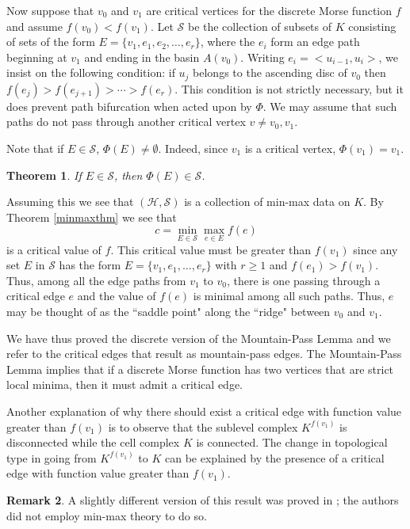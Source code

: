 \documentclass[11pt]{amsart}
\newtheorem{theorem}{Theorem}[section]
\theoremstyle{definition}
\newtheorem{remark}[theorem]{Remark}
\begin{document}
Now suppose that $v_0$ and $v_1$ are critical vertices for the discrete Morse function $f$ and assume $f(v_0)<f(v_1)$. Let $\mathcal{S}$ be the collection of subsets of $K$ consisting of sets of the form $E=\{v_1,e_1,e_2,\dots,e_r\}$, where the $e_i$ form an edge path beginning at $v_1$ and ending in the basin $A(v_0)$. Writing $e_i=<u_{i-1},u_i>$, we insist on the following condition: if $u_j$ belongs to the ascending disc of $v_0$ then $f(e_j)>f(e_{j+1})>\cdots >f(e_r)$. This condition is not strictly necessary, but it does prevent path bifurcation when acted upon by ${\Phi}$.  We may assume that such paths do not pass through another critical vertex $v\ne v_0,v_1$.

Note that if $E\in {\mathcal S}$, ${\Phi}(E)\ne\emptyset$. Indeed, since $v_1$ is a critical vertex, ${\Phi}(v_1)=v_1$. 


\begin{theorem}\label{condition2mtnpass} If $E\in\mathcal{S}$, then ${\Phi} (E) \in \mathcal{S}$. 
\end{theorem}

Assuming this we see that $(\mathcal{H},\mathcal{S})$ is a collection of min-max data on $K$. By Theorem \ref{minmaxthm} we see that 
$$c = \min_{E\in {\mathcal S}}\max_{e\in E} f(e)$$ is a critical value of $f$. This critical value must be greater than $f(v_1)$ since any set $E$ in $\mathcal S$ has the form $E=\{v_1,e_1,\dots,e_r\}$ with $r\ge 1$ and $f(e_1)>f(v_1)$. Thus, among all the edge paths from $v_1$ to $v_0$, there is one passing through a critical edge $e$ and the value of $f(e)$ is minimal among all such paths. Thus, $e$ may be thought of as the ``saddle point" along the ``ridge" between $v_0$ and $v_1$.

We have thus proved the discrete version of the Mountain-Pass Lemma and we refer to the critical edges that result as mountain-pass edges.  The Mountain-Pass Lemma implies that if a discrete Morse function has two vertices that are strict local minima, then it must admit a critical edge. 



Another explanation of why there should exist a critical edge with function value greater than $f(v_1)$ is to observe that the sublevel complex $K^{f(v_1)}$ is disconnected while the cell complex $K$ is connected.  The change in topological type in going from $K^{f(v_1)}$ to $K$ can be explained by the presence of a critical edge with function value greater than $f(v_1)$.

\begin{remark}
A slightly different version of this result was proved in \cite{robins}; the authors did not employ min-max theory to do so. 
\end{remark}
\end{document}
